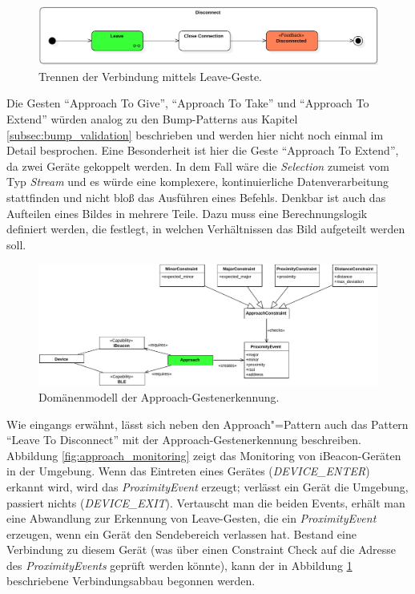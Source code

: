 \begin{figure}[h!]
\centering
\includegraphics[width=1\textwidth]{bilder/approach/disconnect}
\caption{Trennen der Verbindung mittels Leave-Geste.}
\label{fig:approach_disconnect}
\end{figure}

Die Gesten "`Approach To Give"', "`Approach To Take"' und "`Approach To Extend"' würden analog zu den Bump-Patterns aus Kapitel \ref{subsec:bump_validation} beschrieben und werden hier nicht noch einmal im Detail besprochen. Eine Besonderheit ist hier die Geste "`Approach To Extend"', da zwei Geräte gekoppelt werden. In dem Fall wäre die \textit{Selection} zumeist vom Typ \textit{Stream} und es würde eine komplexere, kontinuierliche Datenverarbeitung stattfinden und nicht bloß das Ausführen eines Befehls. Denkbar ist auch das Aufteilen eines Bildes in mehrere Teile. Dazu muss eine Berechnungslogik definiert werden, die festlegt, in welchen Verhältnissen das Bild aufgeteilt werden soll.

\begin{figure}[h!]
\centering
\includegraphics[width=\textwidth]{bilder/approach/domain_model}
\caption{Domänenmodell der Approach-Gestenerkennung.}
\label{fig:approach_domain_model}
\end{figure}

Wie eingangs erwähnt, lässt sich neben den Approach"=Pattern auch das Pattern "`Leave To Disconnect"' mit der Approach-Gestenerkennung beschreiben. Abbildung \ref{fig:approach_monitoring} zeigt das Monitoring von iBeacon-Geräten in der Umgebung. Wenn das Eintreten eines Gerätes (\textit{DEVICE\_ENTER}) erkannt wird, wird das \textit{ProximityEvent} erzeugt; verlässt ein Gerät die Umgebung, passiert nichts (\textit{DEVICE\_EXIT}). Vertauscht man die beiden Events, erhält man eine Abwandlung zur Erkennung von Leave-Gesten, die ein \textit{ProximityEvent} erzeugen, wenn ein Gerät den Sendebereich verlassen hat. Bestand eine Verbindung zu diesem Gerät (was über einen Constraint Check auf die Adresse des \textit{ProximityEvents} geprüft werden könnte), kann der in Abbildung \ref{fig:approach_disconnect} beschriebene Verbindungsabbau begonnen werden.

